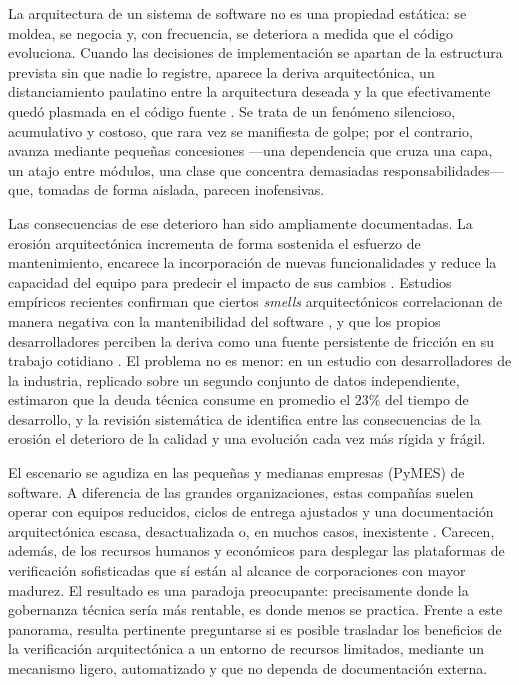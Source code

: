 
La arquitectura de un sistema de software no es una propiedad estática: se moldea, se negocia y, con frecuencia, se deteriora a medida que el código evoluciona. Cuando las decisiones de implementación se apartan de la estructura prevista sin que nadie lo registre, aparece la deriva arquitectónica, un distanciamiento paulatino entre la arquitectura deseada y la que efectivamente quedó plasmada en el código fuente \citep{PerryWolf1992, Li2022}. Se trata de un fenómeno silencioso, acumulativo y costoso, que rara vez se manifiesta de golpe; por el contrario, avanza mediante pequeñas concesiones —una dependencia que cruza una capa, un atajo entre módulos, una clase que concentra demasiadas responsabilidades— que, tomadas de forma aislada, parecen inofensivas.

Las consecuencias de ese deterioro han sido ampliamente documentadas. La erosión arquitectónica incrementa de forma sostenida el esfuerzo de mantenimiento, encarece la incorporación de nuevas funcionalidades y reduce la capacidad del equipo para predecir el impacto de sus cambios \citep{Pigazzini2021}. Estudios empíricos recientes confirman que ciertos \textit{smells} arquitectónicos correlacionan de manera negativa con la mantenibilidad del software \citep{Jolak2025}, y que los propios desarrolladores perciben la deriva como una fuente persistente de fricción en su trabajo cotidiano \citep{Anthony2024}. El problema no es menor: en un estudio con desarrolladores de la industria, replicado sobre un segundo conjunto de datos independiente, \citet{Besker2019} estimaron que la deuda técnica consume en promedio el $23\%$ del tiempo de desarrollo, y la revisión sistemática de \citet{Li2022} identifica entre las consecuencias de la erosión el deterioro de la calidad y una evolución cada vez más rígida y frágil.

El escenario se agudiza en las pequeñas y medianas empresas (PyMES) de software. A diferencia de las grandes organizaciones, estas compañías suelen operar con equipos reducidos, ciclos de entrega ajustados y una documentación arquitectónica escasa, desactualizada o, en muchos casos, inexistente \citep{Hamed2023}. Carecen, además, de los recursos humanos y económicos para desplegar las plataformas de verificación sofisticadas que sí están al alcance de corporaciones con mayor madurez. El resultado es una paradoja preocupante: precisamente donde la gobernanza técnica sería más rentable, es donde menos se practica. Frente a este panorama, resulta pertinente preguntarse si es posible trasladar los beneficios de la verificación arquitectónica a un entorno de recursos limitados, mediante un mecanismo ligero, automatizado y que no dependa de documentación externa.

